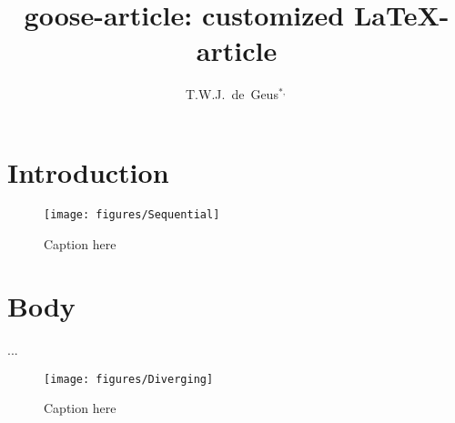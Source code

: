 \documentclass{goose-article}
\title{goose-article: customized \LaTeX-article}
\author[1]{T.W.J.~de~Geus$^{*,}$}
\affil[1]{
  Physics Institute, \'{E}cole Polytechnique F\'{e}d\'{e}rale de Lausanne (EPFL) \nl
  Switzerland
}
\begin{document}
\maketitle

\begin{abstract}
\noindent
\lipsum[1]

\end{abstract}

\section{Introduction}
\lipsum[2-4] \citep{Geus10,Geus11,Geus12}

\begin{figure}[htp]
  \centering
  \texttt{[image: figures/Sequential]}
  \caption{Caption here}
  \label{fig:a}
\end{figure}

\section{Body}
\lipsum[5-10] \citet{Geus13} ...

\begin{figure}[htp]
  \centering
  \texttt{[image: figures/Diverging]}
  \caption{Caption here}
  \label{fig:b}
\end{figure}


\end{document}
